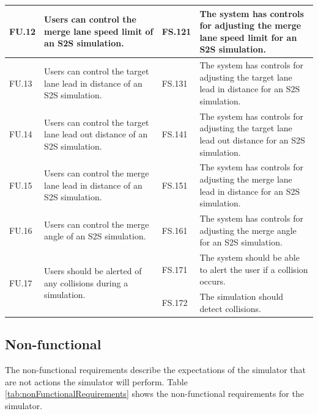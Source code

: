 \begin{longtable}{|p{0.1\linewidth}|p{0.4\linewidth}|p{0.1\linewidth}|p{0.4\linewidth}|}
\hline
FU.12 & Users can control the merge lane speed limit of an S2S simulation. & FS.121 & The system has controls for adjusting the merge lane speed limit for an S2S simulation. \\ 
\hline
FU.13 & Users can control the target lane lead in distance of an S2S simulation. & FS.131 & The system has controls for adjusting the target lane lead in distance for an S2S simulation. \\ 
\hline
FU.14 & Users can control the target lane lead out distance of an S2S simulation. & FS.141 & The system has controls for adjusting the target lane lead out distance for an S2S simulation. \\ 
\hline
FU.15 & Users can control the merge lane lead in distance of an S2S simulation. & FS.151 & The system has controls for adjusting the merge lane lead in distance for an S2S simulation. \\ 
\hline
FU.16 & Users can control the merge angle of an S2S simulation. & FS.161 & The system has controls for adjusting the merge angle for an S2S simulation. \\ 
\hline
\multirow{2}{*}{FU.17} & \multirow{2}{*}{\parbox{\linewidth}{Users should be alerted of any collisions during a simulation.}}
 & FS.171 & The system should be able to alert the user if a collision occurs. \\
 &  & FS.172 & The simulation should detect collisions. \\ 
\end{longtable}

\subsection{Non-functional}
\label{subsec:Non-functional}
The non-functional requirements describe the expectations of the simulator that are not actions the simulator will perform. Table \ref{tab:nonFunctionalRequirements} shows the non-functional requirements for the simulator.

